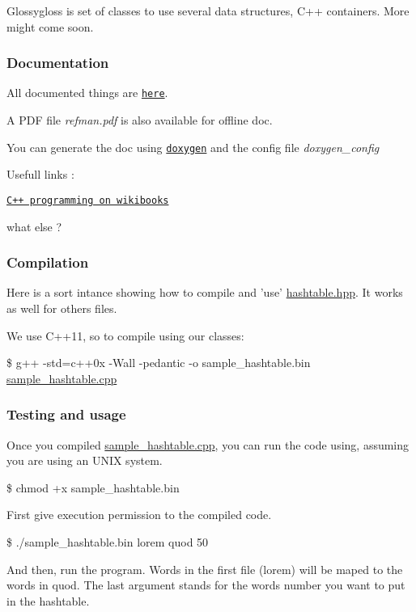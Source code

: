 Glossygloss is set of classes to use several data structures, C++ containers. More might come soon.

\subsubsection*{Documentation}

All documented things are \href{http://blasterbug.github.io/glossygloss/}{\tt here}.

A P\-D\-F file {\itshape refman.\-pdf} is also available for offline doc.

You can generate the doc using \href{http://www.stack.nl/~dimitri/doxygen/}{\tt doxygen} and the config file {\itshape doxygen\-\_\-config}

Usefull links \-:
\begin{DoxyItemize}
\item \href{http://en.wikibooks.org/wiki/C%2B%2B_Programming}{\tt C++ programming on wikibooks}
\item what else ?
\end{DoxyItemize}

\subsubsection*{Compilation}

Here is a sort intance showing how to compile and 'use' \hyperlink{hashtable_8hpp}{hashtable.\-hpp}. It works as well for others files.

We use C++11, so to compile using our classes\-:

\$ g++ -\/std=c++0x -\/\-Wall -\/pedantic -\/o sample\-\_\-hashtable.\-bin \hyperlink{sample__hashtable_8cpp}{sample\-\_\-hashtable.\-cpp}

\subsubsection*{Testing and usage}

Once you compiled \hyperlink{sample__hashtable_8cpp}{sample\-\_\-hashtable.\-cpp}, you can run the code using, assuming you are using an U\-N\-I\-X system.

\$ chmod +x sample\-\_\-hashtable.\-bin

First give execution permission to the compiled code.

\$ ./sample\-\_\-hashtable.bin lorem quod 50

And then, run the program. Words in the first file (lorem) will be maped to the words in quod. The last argument stands for the words number you want to put in the hashtable.

